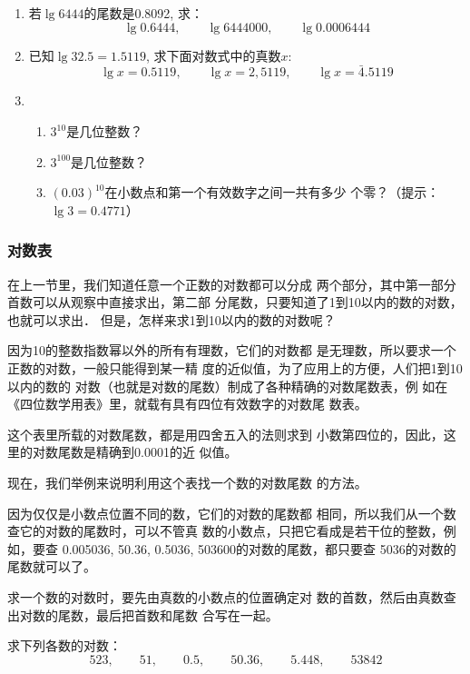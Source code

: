 \begin{ex}
\begin{enumerate}
\item 若$\lg6444$的尾数是0.8092, 求：
\[\lg0.6444,\qquad \lg6444000,\qquad \lg0.0006444\]
\item 已知$\lg32.5=1.5119$, 求下面对数式中的真数$x$:
\[\lg x=0.5119,\qquad \lg x=2,5119,\qquad \lg x=\bar{4}.5119\]
\item \begin{enumerate}
\item $3^{10}$是几位整数？
\item $3^{100}$是几位整数？
\item $(0.03)^{10}$在小数点和第一个有效数字之间一共有多少
个零？（提示：$\lg3=0.4771$）
\end{enumerate}
\end{enumerate}
\end{ex}

\subsubsection{对数表}
在上一节里，我们知道任意一个正数的对数都可以分成
两个部分，其中第一部分首数可以从观察中直接求出，第二部
分尾数，只要知道了1到10以内的数的对数，也就可以求出．
但是，怎样来求1到10以内的数的对数呢？

因为10的整数指数幂以外的所有有理数，它们的对数都
是无理数，所以要求一个正数的对数，一般只能得到某一精
度的近似值，为了应用上的方便，人们把1到10以内的数的
对数（也就是对数的尾数）制成了各种精确的对数尾数表，例
如在《四位数学用表》里，就载有具有四位有效数字的对数尾
数表。

这个表里所载的对数尾数，都是用四舍五入的法则求到
小数第四位的，因此，这里的对数尾数是精确到0.0001的近
似值。

现在，我们举例来说明利用这个表找一个数的对数尾数
的方法。

因为仅仅是小数点位置不同的数，它们的对数的尾数都
相同，所以我们从一个数查它的对数的尾数时，可以不管真
数的小数点，只把它看成是若干位的整数，例如，要查
0.005036, 50.36, 0.5036, 503600的对数的尾数，都只要查
5036的对数的尾数就可以了。

求一个数的对数时，要先由真数的小数点的位置确定对
数的首数，然后由真数查出对数的尾数，最后把首数和尾数
合写在一起。

\begin{example}
    求下列各数的对数：
\[523,\qquad 51,\qquad 0.5,\qquad 50.36,\qquad 5.448,\qquad 53842\]
\end{example}

